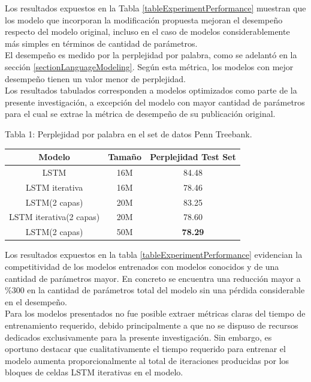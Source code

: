 \documentclass{article}
\begin{document}
	Los resultados expuestos en la Tabla \ref{tableExperimentPerformance} muestran que los modelo que incorporan la modificación propuesta mejoran el desempeño respecto del modelo original, incluso en el caso de modelos considerablemente más simples en términos de cantidad de parámetros. \\
	El desempeño es medido por la perplejidad por palabra, como se adelantó en la sección \ref{sectionLanguageModeling}. Según esta métrica, los modelos con mejor desempeño tienen un valor menor de perplejidad.\\
	Los resultados tabulados corresponden a modelos optimizados como parte de la presente investigación, a excepción del modelo con mayor cantidad de parámetros para el cual se extrae la métrica de desempeño de su publicación original\cite{14RegularizationZaremba}.\\
	\begin{center}
		Tabla 1: Perplejidad por palabra en el set de datos Penn Treebank.\\
		
		\begin{tabular}[t]{| c  | c | c |}
			\hline
			Modelo & Tamaño & Perplejidad Test Set\\
			\hline
			\hline
			LSTM & 16M  & 84.48\\
			\hline
			LSTM iterativa & 16M  & 78.46\\
			\hline
			\hline
			LSTM(2 capas) & 20M  & 83.25\\
			\hline
			LSTM iterativa(2 capas) & 20M  & 78.60\\
			\hline
			\hline
			LSTM(2 capas)& 50M & \textbf{78.29}\\
			\hline
		\end{tabular}
		\label{tableExperimentPerformance}
	\end{center}
	
	Los resultados expuestos en la tabla \ref{tableExperimentPerformance} evidencian la competitividad de los modelos entrenados con modelos conocidos y de una cantidad de parámetros mayor. En concreto se encuentra una reducción mayor a \%300 en la cantidad de parámetros total del modelo sin una pérdida considerable en el desempeño.\\
	
	Para los modelos presentados no fue posible extraer métricas claras del tiempo de entrenamiento requerido, debido principalmente a que no se dispuso de recursos dedicados exclusivamente para la presente investigación. Sin embargo, es oportuno destacar que cualitativamente el tiempo requerido para entrenar el modelo aumenta proporcionalmente al total de iteraciones producidas por los bloques de celdas LSTM iterativas en el modelo.\\
	
\end{document}

